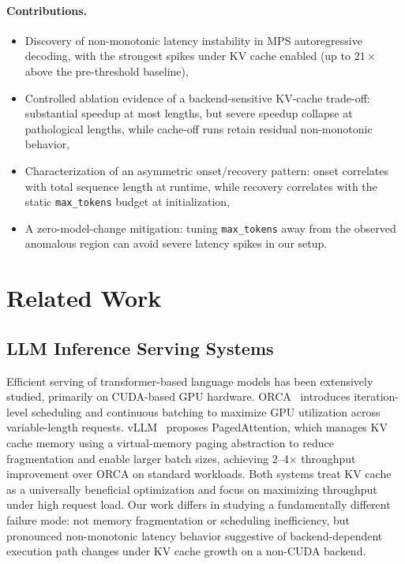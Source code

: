 \documentclass{article}
\begin{document}
\paragraph{Contributions.}
\begin{itemize}
\item Discovery of non-monotonic latency instability in MPS autoregressive decoding, with the strongest spikes under KV cache enabled (up to $21\times$ above the pre-threshold baseline),
\item Controlled ablation evidence of a backend-sensitive KV-cache trade-off: substantial speedup at most lengths, but severe speedup collapse at pathological lengths, while cache-off runs retain residual non-monotonic behavior,
\item Characterization of an asymmetric onset/recovery pattern: onset correlates with total sequence length at runtime, while recovery correlates with the static \texttt{max\_tokens} budget at initialization,
\item A zero-model-change mitigation: tuning \texttt{max\_tokens} away from the observed anomalous region can avoid severe latency spikes in our setup.
\end{itemize}

\section{Related Work}

\subsection{LLM Inference Serving Systems}

Efficient serving of transformer-based language models has been extensively studied, primarily on CUDA-based GPU hardware.
ORCA~\cite{yu2022orca} introduces iteration-level scheduling and continuous batching to maximize GPU utilization across variable-length requests.
vLLM~\cite{kwon2023pagedattention} proposes PagedAttention, which manages KV cache memory using a virtual-memory paging abstraction to reduce fragmentation and enable larger batch sizes, achieving 2--4$\times$ throughput improvement over ORCA on standard workloads.
Both systems treat KV cache as a universally beneficial optimization and focus on maximizing throughput under high request load.
Our work differs in studying a fundamentally different failure mode: not memory fragmentation or scheduling inefficiency, but pronounced non-monotonic latency behavior suggestive of backend-dependent execution path changes under KV cache growth on a non-CUDA backend.
\end{document}
